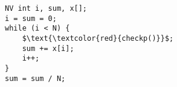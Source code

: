 \documentclass[border={20pt 5pt 21pt 10pt}]{standalone} %
\begin{document}
	

\begin{lstlisting}[style=mystyle, linewidth=115px]
NV int i, sum, x[];
i = sum = 0;
while (i < N) {
    $\text{\textcolor{red}{checkp()}}$;
    sum += x[i];
    i++;
}
sum = sum / N;
\end{lstlisting} 
\end{document}
